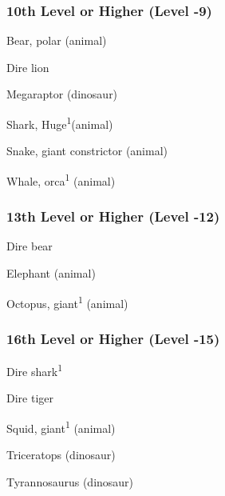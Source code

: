 \subsubsection{10th Level or Higher (Level -9)}

\begin{itemize*}
\item Bear, polar (animal) 
\item Dire lion 
\item Megaraptor (dinosaur) 
\item Shark, Huge\textsuperscript{1}(animal)
\item Snake, giant constrictor (animal)
\item Whale, orca\textsuperscript{1} (animal)
\end{itemize*}

\subsubsection{13th Level or Higher (Level -12)}

\begin{itemize*}
\item Dire bear 
\item Elephant (animal)
\item Octopus, giant\textsuperscript{1} (animal)
\end{itemize*}

\subsubsection{16th Level or Higher (Level -15)}

\begin{itemize*}
\item Dire shark\textsuperscript{1}
\item Dire tiger 
\item Squid, giant\textsuperscript{1} (animal)
\item Triceratops (dinosaur)
\item Tyrannosaurus (dinosaur)
\end{itemize*}
